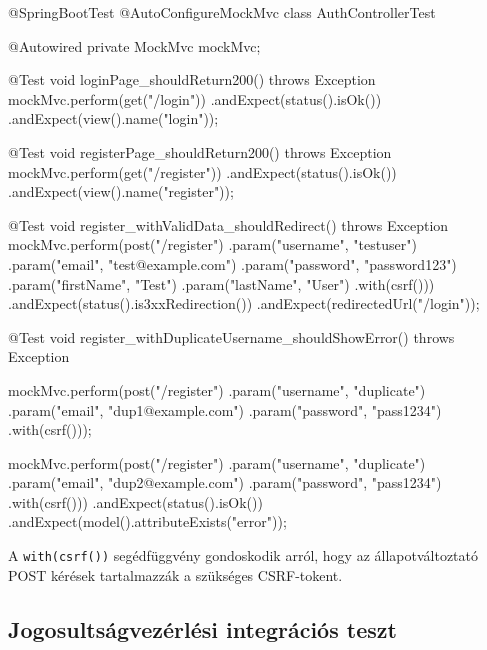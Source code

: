 \begin{java}[caption={Bejelentkezési és regisztrációs MockMvc tesztek},label=java:authtests]
@SpringBootTest
@AutoConfigureMockMvc
class AuthControllerTest {

    @Autowired
    private MockMvc mockMvc;

    @Test
    void loginPage_shouldReturn200() throws Exception {
        mockMvc.perform(get("/login"))
               .andExpect(status().isOk())
               .andExpect(view().name("login"));
    }

    @Test
    void registerPage_shouldReturn200() throws Exception {
        mockMvc.perform(get("/register"))
               .andExpect(status().isOk())
               .andExpect(view().name("register"));
    }

    @Test
    void register_withValidData_shouldRedirect() throws Exception {
        mockMvc.perform(post("/register")
                   .param("username", "testuser")
                   .param("email", "test@example.com")
                   .param("password", "password123")
                   .param("firstName", "Test")
                   .param("lastName", "User")
                   .with(csrf()))
               .andExpect(status().is3xxRedirection())
               .andExpect(redirectedUrl("/login"));
    }

    @Test
    void register_withDuplicateUsername_shouldShowError()
            throws Exception {
        mockMvc.perform(post("/register")
                   .param("username", "duplicate")
                   .param("email", "dup1@example.com")
                   .param("password", "pass1234")
                   .with(csrf()));

        mockMvc.perform(post("/register")
                   .param("username", "duplicate")
                   .param("email", "dup2@example.com")
                   .param("password", "pass1234")
                   .with(csrf()))
               .andExpect(status().isOk())
               .andExpect(model().attributeExists("error"));
    }
}
\end{java}

A \texttt{with(csrf())} segédfüggvény gondoskodik arról, hogy az állapotváltoztató POST kérések tartalmazzák a szükséges CSRF-tokent.

\subsection{Jogosultságvezérlési integrációs teszt}

